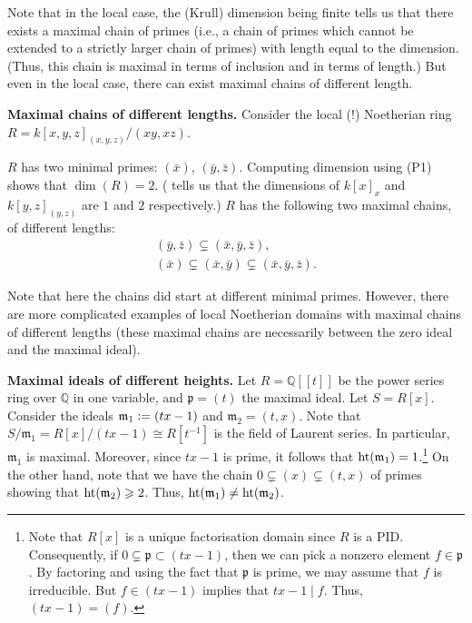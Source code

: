 \documentclass[12pt]{article}
\begin{document}
Note that in the local case, the (Krull) dimension being finite tells us that there exists a maximal chain of primes (i.e., a chain of primes which cannot be extended to a strictly larger chain of primes) with length equal to the dimension. (Thus, this chain is maximal in terms of inclusion and in terms of length.) \newline
But even in the local case, there can exist maximal chains of different length.

\textbf{Maximal chains of different lengths.} \newline
Consider the local (!) Noetherian ring $R = k[x, y, z]_{(x, y, z)}/(xy, xz)$.

$R$ has two minimal primes: $(\bar{x})$, $(\bar{y}, \bar{z})$. Computing dimension using (P1) shows that $\dim(R) = 2$. ( tells us that the dimensions of $k[x]_{x}$ and $k[y, z]_{(y, z)}$ are $1$ and $2$ respectively.) \newline
$R$ has the following two maximal chains, of different lengths:
\begin{align*} 
	(\bar{y}, \bar{z}) \subsetneq (\bar{x}, \bar{y}, \bar{z}), \\
	(\bar{x}) \subsetneq (\bar{x}, \bar{y}) \subsetneq (\bar{x}, \bar{y}, \bar{z}).
\end{align*}

Note that here the chains did start at different minimal primes. However, there are more complicated examples of local Noetherian domains with maximal chains of different lengths (these maximal chains are necessarily between the zero ideal and the maximal ideal).

\textbf{Maximal ideals of different heights.} \newline
Let $R = \mathbb{Q}[\![t]\!]$ be the power series ring over $\mathbb{Q}$ in one variable, and $\mathfrak{p} = (t)$ the maximal ideal. \newline
Let $S = R[x]$. \newline
Consider the ideals $\mathfrak{m}_{1} \vcentcolon= (tx - 1)$ and $\mathfrak{m}_{2} = (t, x)$. \newline
Note that $S/\mathfrak{m}_{1} = R[x]/(tx - 1) \cong R[t^{-1}]$ is the field of Laurent series. In particular, $\mathfrak{m}_{1}$ is maximal. Moreover, since $tx - 1$ is prime, it follows that $\operatorname{ht}(\mathfrak{m}_{1}) = 1$.\footnote{Note that $R[x]$ is a unique factorisation domain since $R$ is a PID. Consequently, if $0 \subsetneq \mathfrak{p} \subset (tx - 1)$, then we can pick a nonzero element $f \in \mathfrak{p}$. By factoring and using the fact that $\mathfrak{p}$ is prime, we may assume that $f$ is irreducible. But $f \in (tx - 1)$ implies that $tx - 1 \mid f$. Thus, $(tx - 1) = (f)$.} \newline
On the other hand, note that we have the chain $0 \subsetneq (x) \subsetneq (t, x)$ of primes showing that $\operatorname{ht}(\mathfrak{m}_{2}) \geqslant 2$. Thus, $\operatorname{ht}(\mathfrak{m}_{1}) \neq \operatorname{ht}(\mathfrak{m}_{2})$.
\end{document}
